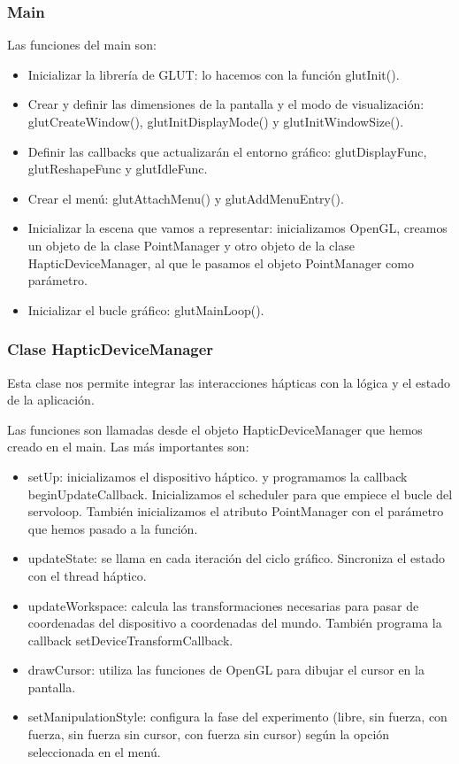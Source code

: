 \documentclass[a4paper,11pt, oneside]{book}
\begin{document}
\subsubsection{Main}

Las funciones del main son:
\begin{itemize}
	\item Inicializar la librería de GLUT: lo hacemos con la función glutInit().
	\item Crear y definir las dimensiones de la pantalla y el modo de visualización: glutCreateWindow(), glutInitDisplayMode() y glutInitWindowSize().
	\item Definir las callbacks que actualizarán el entorno gráfico: glutDisplayFunc, glutReshapeFunc y glutIdleFunc. 
	\item Crear el menú: glutAttachMenu() y glutAddMenuEntry().
	\item Inicializar la escena que vamos a representar: inicializamos OpenGL, creamos un objeto de la clase PointManager y otro objeto de la clase HapticDeviceManager, al que le pasamos el objeto PointManager como parámetro.
	\item Inicializar el bucle gráfico: glutMainLoop().
\end{itemize}




\subsubsection{Clase HapticDeviceManager}

Esta clase nos permite integrar las interacciones hápticas con la lógica y el estado de la aplicación.

Las funciones son llamadas desde el objeto HapticDeviceManager que hemos creado en el main. Las más importantes son:

\begin{itemize}
	\item setUp: inicializamos el dispositivo háptico. y programamos la callback beginUpdateCallback. Inicializamos el scheduler para que empiece el bucle del servoloop. También inicializamos el atributo PointManager con el parámetro que hemos pasado a la función.

	
	\item updateState: se llama en cada iteración del ciclo gráfico. Sincroniza el estado con el thread háptico.
	
	\item updateWorkspace: calcula las transformaciones necesarias para pasar de coordenadas del dispositivo a coordenadas del mundo. También programa la callback setDeviceTransformCallback.
		
	\item drawCursor: utiliza las funciones de OpenGL para dibujar el cursor en la pantalla.
	
	\item setManipulationStyle: configura la fase del experimento (libre, sin fuerza, con fuerza, sin fuerza sin cursor, con fuerza sin cursor) según la opción seleccionada en el menú.
\end{itemize}
\end{document}
